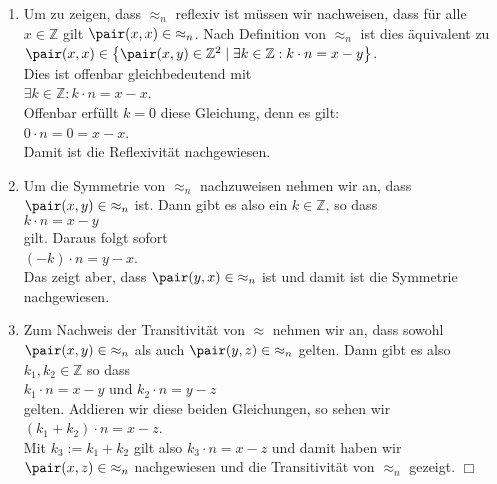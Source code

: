 \begin{enumerate}
\item Um zu zeigen, dass $\approx_n$ reflexiv ist müssen wir nachweisen, dass für alle
      $x \in \mathbb{Z}$ gilt $\pair(x,x) \in\; \approx_n$.  Nach Definition von $\approx_n$
      ist dies äquivalent zu \\[0.2cm]
      \hspace*{1.3cm}
      $\pair(x,x) \in \bigl\{ \pair(x,y) \in \mathbb{Z}^2 \mid \exists k \in \mathbb{Z}: k \cdot n = x - y \bigr\}$.
      \\[0.2cm]
      Dies ist offenbar gleichbedeutend mit \\[0.2cm]
      \hspace*{1.3cm}
      $\exists k \in \mathbb{Z}: k \cdot n = x - x$.
      \\[0.2cm]
      Offenbar erfüllt $k=0$ diese Gleichung, denn es gilt: \\[0.2cm]
      \hspace*{1.3cm}
      $0\cdot n = 0 = x - x$. 
      \\[0.2cm]
      Damit ist die Reflexivität nachgewiesen.
\item Um die Symmetrie von $\approx_n$ nachzuweisen nehmen wir an, dass 
      $\pair(x,y) \in\; \approx_n$ ist.  Dann gibt es also ein $k \in \mathbb{Z}$, so dass
      \\[0.2cm]
      \hspace*{1.3cm}      
      $k\cdot n = x - y$
      \\[0.2cm] 
      gilt.  Daraus folgt sofort
      \\[0.2cm]
      \hspace*{1.3cm}      
      $(-k)\cdot n = y - x$.
      \\[0.2cm]
      Das zeigt aber, dass $\pair(y,x) \in\; \approx_n$ ist und damit ist die Symmetrie
      nachgewiesen.
\item Zum Nachweis der Transitivität von $\approx$ nehmen wir an, dass
      sowohl $\pair(x,y) \in\; \approx_n$ als auch $\pair(y,z) \in\; \approx_n$
      gelten.  Dann gibt es also $k_1,k_2 \in \mathbb{Z}$ so dass 
      \\[0.2cm]
      \hspace*{1.3cm}      
      $k_1 \cdot n = x - y$ \quad und \quad $k_2 \cdot n = y - z$ 
      \\[0.2cm]
      gelten.  Addieren wir diese beiden Gleichungen, so sehen wir
      \\[0.2cm]
      \hspace*{1.3cm}      
      $(k_1 + k_2) \cdot n = x - z$.
      \\[0.2cm]
      Mit $k_3 := k_1 + k_2$ gilt also $k_3\cdot n = x - z$ und damit haben wir
      $\pair(x,z) \in\; \approx_n$ nachgewiesen und die Transitivität von $\approx_n$
      gezeigt.  \hspace*{\fill} $\Box$      
\end{enumerate}

